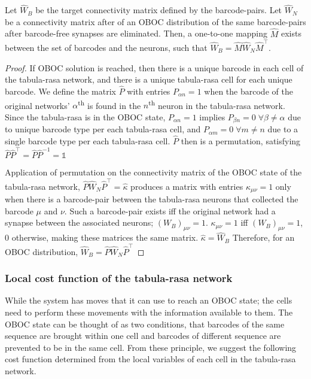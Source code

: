 \documentclass[../dissertation.tex]{subfiles}
\begin{document}
\begin{theorem}
    \label{thr:cc-1}
    Let $\hat{W}_B$ be the target connectivity matrix defined by the barcode-pairs.
    Let $\hat{W}_N$ be a connectivity matrix after of an OBOC distribution of the same barcode-pairs after barcode-free synapses are eliminated.
    Then, a one-to-one mapping $\hat{M}$ exists between the set of barcodes and the neurons, such that $\hat{W}_B = \hat{M} \hat{W}_N \hat{M}^\intercal$.
\end{theorem}

\begin{proof}
    If OBOC solution is reached, then there is a unique barcode in each cell of the tabula-rasa network, and there is a unique tabula-rasa cell for each unique barcode.
    We define the matrix $\hat{P}$ with entries $P_{\alpha n} = 1$ when the barcode of the original networks' $\alpha$\textsuperscript{th} is found in the $n$\textsuperscript{th} neuron in the tabula-rasa network.
    Since the tabula-rasa is in the OBOC state, $P_{\alpha n} = 1$ implies ${P_{\beta n} = 0 \; \forall \beta \neq \alpha}$ due to unique barcode type per each tabula-rasa cell, and ${P_{\alpha m} = 0 \; \forall m \neq n}$ due to a single barcode type per each tabula-rasa cell.
    $\hat{P}$ then is a permutation, satisfying ${\hat{P}\hat{P}^\intercal = \hat{P}\hat{P}^{-1} = \mathbb{1}}$

    Application of permutation on the connectivity matrix of the OBOC state of the tabula-rasa network, ${\hat{P}\hat{W}_N \hat{P}^\intercal} = \hat{\kappa}$ produces a matrix with entries $\kappa_{\mu \nu} = 1$ only when there is a barcode-pair between the tabula-rasa neurons that collected the barcode $\mu$ and $\nu$.
    Such a barcode-pair exists iff the original network had a synapse between the associated neurons; $(W_B)_{\mu \nu} = 1$.
    $\kappa_{\mu \nu} = 1$ iff $(W_B)_{\mu \nu} = 1$, $0$ otherwise, making these matrices the same matrix.
    $\hat{\kappa} = \hat{W}_B$
    Therefore, for an OBOC distribution, $\hat{W}_B = \hat{P} \hat{W}_N \hat{P}^\intercal$
\end{proof}

\subsubsection{Local cost function of the tabula-rasa network}

While the system has moves that it can use to reach an OBOC state; the cells need to perform these movements with the information available to them.
The OBOC state can be thought of as two conditions, that barcodes of the same sequence are brought within one cell and barcodes of different sequence are prevented to be in the same cell.
From these principle, we suggest the following cost function determined from the local variables of each cell in the tabula-rasa network.
\end{document}
